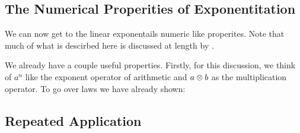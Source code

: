 \subsection{The Numerical Properities of Exponentitation}

We can now get to the linear exponentails numeric like properites.
Note that much of what is descirbed here is discussed at length by \citeauthor{inverse_of_type}.

We already have a couple useful properties.
Firstly, for this discussion, we think of $a^n$ like the exponent operator of arithmetic and $a \otimes b$ as the multiplication operator. 
To go over laws we have already shown:


\subsection{Repeated Application}
